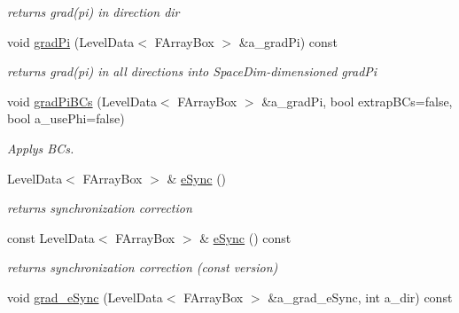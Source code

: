 \begin{DoxyCompactItemize}
\begin{DoxyCompactList}\small\item\em returns grad(pi) in direction dir \end{DoxyCompactList}\item 
\hypertarget{class_c_c_projector_a21908065e9659406950b034adc339308}{void \hyperlink{class_c_c_projector_a21908065e9659406950b034adc339308}{grad\-Pi} (Level\-Data$<$ F\-Array\-Box $>$ \&a\-\_\-grad\-Pi) const }\label{class_c_c_projector_a21908065e9659406950b034adc339308}

\begin{DoxyCompactList}\small\item\em returns grad(pi) in all directions into Space\-Dim-\/dimensioned grad\-Pi \end{DoxyCompactList}\item 
\hypertarget{class_c_c_projector_aec099d756e323d4cb5e04568d668a95c}{void \hyperlink{class_c_c_projector_aec099d756e323d4cb5e04568d668a95c}{grad\-Pi\-B\-Cs} (Level\-Data$<$ F\-Array\-Box $>$ \&a\-\_\-grad\-Pi, bool extrap\-B\-Cs=false, bool a\-\_\-use\-Phi=false)}\label{class_c_c_projector_aec099d756e323d4cb5e04568d668a95c}

\begin{DoxyCompactList}\small\item\em Applys B\-Cs. \end{DoxyCompactList}\item 
\hypertarget{class_c_c_projector_ab9392b70ccfc766ec6ef7433812c307e}{Level\-Data$<$ F\-Array\-Box $>$ \& \hyperlink{class_c_c_projector_ab9392b70ccfc766ec6ef7433812c307e}{e\-Sync} ()}\label{class_c_c_projector_ab9392b70ccfc766ec6ef7433812c307e}

\begin{DoxyCompactList}\small\item\em returns synchronization correction \end{DoxyCompactList}\item 
\hypertarget{class_c_c_projector_acbfcf47382339b5df185df7ef9c831c5}{const Level\-Data$<$ F\-Array\-Box $>$ \& \hyperlink{class_c_c_projector_acbfcf47382339b5df185df7ef9c831c5}{e\-Sync} () const }\label{class_c_c_projector_acbfcf47382339b5df185df7ef9c831c5}

\begin{DoxyCompactList}\small\item\em returns synchronization correction (const version) \end{DoxyCompactList}\item 
\hypertarget{class_c_c_projector_adde417ede217d2f34412cea08570793e}{void \hyperlink{class_c_c_projector_adde417ede217d2f34412cea08570793e}{grad\-\_\-e\-Sync} (Level\-Data$<$ F\-Array\-Box $>$ \&a\-\_\-grad\-\_\-e\-Sync, int a\-\_\-dir) const }\label{class_c_c_projector_adde417ede217d2f34412cea08570793e}


\end{DoxyCompactItemize}
